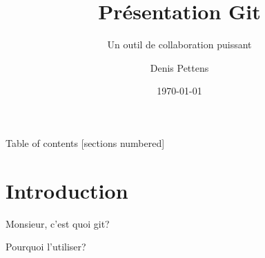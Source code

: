 \documentclass{beamer}
\title{Présentation Git}
\subtitle{Un outil de collaboration puissant}
\date{\today}
\author{Denis Pettens}
\institute{Louvain-li-Nux}
\begin{document}
  \maketitle

  \begin{frame}{Table of contents}
      [sections numbered]
      \tableofcontents[hideallsubsections]
  \end{frame}

  \section{Introduction}
  \begin{frame}{Monsieur, c'est quoi git?}

  \end{frame}
  \begin{frame}{Pourquoi l'utiliser?}

  \end{frame}


\end{document}
